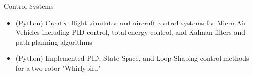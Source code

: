 \documentclass[]{friggeri-cv}
\begin{document}
\begin{entrylist}






    \entry
    {}
    {Control Systems}
    {}
    {\vspace{-4mm}
    \begin{itemize}
        \item (Python) Created flight simulator and aircraft control systems for Micro Air Vehicles including PID control, total energy control, and Kalman filters and path planning algorithms
        \item (Python) Implemented PID, State Space, and Loop Shaping control methods for a two rotor "Whirlybird"
    \end{itemize}
    \vspace{1mm}}









\end{entrylist}
\end{document}
